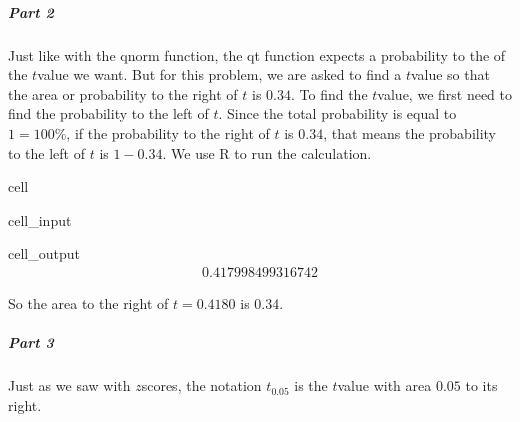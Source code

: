 \documentclass[letterpaper,10pt,english]{jupyterBook}
\begin{document}
\subparagraph{Part 2}
\label{\detokenize{Ch5 Confidence Intervals/5.3 Student's t-Distribution:id4}}
\sphinxAtStartPar
Just like with the qnorm function, the qt function expects a probability to the  of the \(t\)\sphinxhyphen{}value we want. But for this problem, we are asked to find a \(t\)\sphinxhyphen{}value so that the area or probability to the right of \(t\) is \(0.34\). To find the \(t\)\sphinxhyphen{}value, we first need to find the probability to the left of \(t\). Since the total probability is equal to \(1 = 100\%\), if the probability to the right of \(t\) is \(0.34\), that means the probability to the left of \(t\) is \(1 - 0.34\). We use R to run the calculation.

\begin{sphinxuseclass}{cell}\begin{sphinxVerbatimInput}

\begin{sphinxuseclass}{cell_input}
\begin{sphinxVerbatim}[commandchars=\\\{\}]
\end{sphinxVerbatim}

\end{sphinxuseclass}\end{sphinxVerbatimInput}
\begin{sphinxVerbatimOutput}

\begin{sphinxuseclass}{cell_output}\begin{equation*}
\begin{split}0.417998499316742\end{split}
\end{equation*}
\end{sphinxuseclass}\end{sphinxVerbatimOutput}

\end{sphinxuseclass}
\sphinxAtStartPar
So the area to the right of \(t = 0.4180\) is \(0.34\).


\subparagraph{Part 3}
\label{\detokenize{Ch5 Confidence Intervals/5.3 Student's t-Distribution:id5}}
\sphinxAtStartPar
Just as we saw with \(z\)\sphinxhyphen{}scores, the notation \(t_{0.05}\) is the \(t\)\sphinxhyphen{}value with area \(0.05\) to its right.
\end{document}
